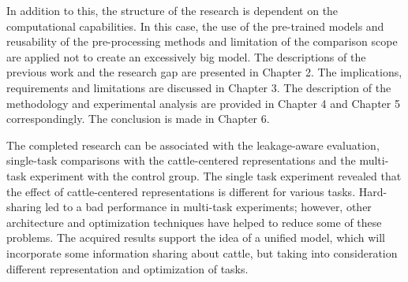 In addition to this, the structure of the research is dependent on the computational capabilities. In this case, the use of the pre-trained models and reusability of the pre-processing methods and limitation of the comparison scope are applied not to create an excessively big model. The descriptions of the previous work and the research gap are presented in Chapter 2. The implications, requirements and limitations are discussed in Chapter 3. The description of the methodology and experimental analysis are provided in Chapter 4 and Chapter 5 correspondingly. The conclusion is made in Chapter 6.

The completed research can be associated with the leakage-aware evaluation, single-task comparisons with the cattle-centered representations and the multi-task experiment with the control group. The single task experiment revealed that the effect of cattle-centered representations is different for various tasks. Hard-sharing led to a bad performance in multi-task experiments; however, other architecture and optimization techniques have helped to reduce some of these problems. The acquired results support the idea of a unified model, which will incorporate some information sharing about cattle, but taking into consideration different representation and optimization of tasks.
